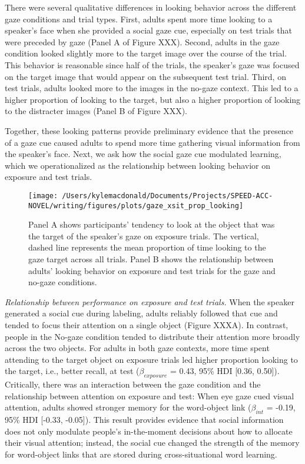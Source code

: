 \documentclass[man,floatsintext]{apa6}
\begin{document}
There were several qualitative differences in looking behavior across
the different gaze conditions and trial types. First, adults spent more
time looking to a speaker's face when she provided a social gaze cue,
especially on test trials that were preceded by gaze (Panel A of Figure
XXX). Second, adults in the gaze condition looked slightly more to the
target image over the course of the trial. This behavior is reasonable
since half of the trials, the speaker's gaze was focused on the target
image that would appear on the subsequent test trial. Third, on test
trials, adults looked more to the images in the no-gaze context. This
led to a higher proportion of looking to the target, but also a higher
proportion of looking to the distracter images (Panel B of Figure XXX).

Together, these looking patterns provide preliminary evidence that the
presence of a gaze cue caused adults to spend more time gathering visual
information from the speaker's face. Next, we ask how the social gaze
cue modulated learning, which we operationalized as the relationship
between looking behavior on exposure and test trials.

\begin{figure}[!t]

{\centering \texttt{[image: /Users/kylemacdonald/Documents/Projects/SPEED-ACC-NOVEL/writing/figures/plots/gaze\_xsit\_prop\_looking]} 

}

\caption{Panel A shows participants’ tendency to look at the object that was the target of the speaker’s gaze on exposure trials. The vertical, dashed line represents the mean proportion of time looking to the gaze target across all trials. Panel B shows the relationship between adults' looking behavior on exposure and test trials for the gaze and no-gaze conditions.}\label{fig:gaze-xsit-prop-looking-plot}
\end{figure}

\emph{Relationship between performance on exposure and test trials.}
When the speaker generated a social cue during labeling, adults reliably
followed that cue and tended to focus their attention on a single object
(Figure XXXA). In contrast, people in the No-gaze condition tended to
distribute their attention more broadly across the two objects. For
adults in both gaze contexts, more time spent attending to the target
object on exposure trials led higher proportion looking to the target,
i.e., better recall, at test (\(\beta_{exposure}\) = 0.43, 95\% HDI
{[}0.36, 0.50{]}). Critically, there was an interaction between the gaze
condition and the relationship between attention on exposure and test:
When eye gaze cued visual attention, adults showed stronger memory for
the word-object link (\(\beta_{int}\) = -0.19, 95\% HDI {[}-0.33,
-0.05{]}). This result provides evidence that social information does
not only modulate people's in-the-moment decisions about how to allocate
their visual attention; instead, the social cue changed the strength of
the memory for word-object links that are stored during
cross-situational word learning.
\end{document}
